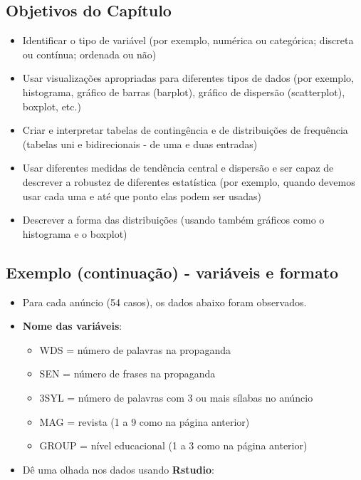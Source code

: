\documentclass[]{article}
\providecommand{\tightlist}{%
  \setlength{\itemsep}{0pt}\setlength{\parskip}{0pt}}
\begin{document}
\subsection{Objetivos do Capítulo}\label{objetivos-do-capitulo}

\begin{itemize}
\tightlist
\item
  Identificar o tipo de variável (por exemplo, numérica ou categórica;
  discreta ou contínua; ordenada ou não)
\item
  Usar visualizações apropriadas para diferentes tipos de dados (por
  exemplo, histograma, gráfico de barras (barplot), gráfico de dispersão
  (scatterplot), boxplot, etc.)
\item
  Criar e interpretar tabelas de contingência e de distribuições de
  frequência (tabelas uni e bidirecionais - de uma e duas entradas)
\item
  Usar diferentes medidas de tendência central e dispersão e ser capaz
  de descrever a robustez de diferentes estatística (por exemplo, quando
  devemos usar cada uma e até que ponto elas podem ser usadas)
\item
  Descrever a forma das distribuições (usando também gráficos como o
  histograma e o boxplot)
\end{itemize}

\subsection{Exemplo (continuação) - variáveis e
formato}\label{exemplo-continuacao---variaveis-e-formato}

\begin{itemize}
\tightlist
\item
  Para cada anúncio (54 casos), os dados abaixo foram observados.
\item
  \textbf{Nome das variáveis}:

  \begin{itemize}
  \tightlist
  \item
    WDS = número de palavras na propaganda
  \item
    SEN = número de frases na propaganda
  \item
    3SYL = número de palavras com 3 ou mais sílabas no anúncio
  \item
    MAG = revista (1 a 9 como na página anterior)
  \item
    GROUP = nível educacional (1 a 3 como na página anterior)
  \end{itemize}
\item
  Dê uma olhada nos dados usando \textbf{Rstudio}:
\end{itemize}
\end{document}
